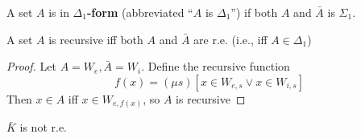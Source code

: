 \documentclass[11pt]{article}
\begin{document}
\begin{definition}[]
A set \(A\) is in \textbf{\(\Delta_1\)-form} (abbreviated ``\(A\) is \(\Delta_1\)'')
if both \(A\) and \(\bar{A}\) is \(\Sigma_1\).
\end{definition}

\begin{theorem}
\label{thm2.1.12}
A set \(A\) is recursive iff both \(A\) and \(\bar{A}\) are r.e. (i.e., iff \(A\in\Delta_1\))
\end{theorem}

\begin{proof}
Let \(A=W_e,\bar{A}=W_i\). Define the recursive function
\begin{equation*}
f(x)=(\mu s)[x\in W_{e,s}\vee x\in W_{i,s}]
\end{equation*}
Then \(x\in A\) iff \(x\in W_{e,f(x)}\), so \(A\) is recursive
\end{proof}

\begin{corollary}[]
\(\bar{K}\) is not r.e.
\end{corollary}
\end{document}
